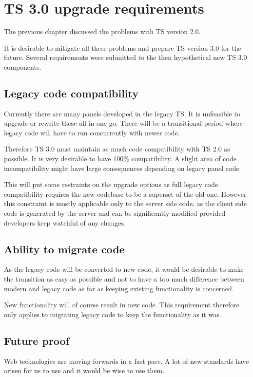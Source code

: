 \chapter{TS 3.0 upgrade requirements}
The previous chapter discussed the problems with TS version 2.0.

It is desirable to mitigate all these problems and prepare TS version 3.0 for
the future.
Several requirements were submitted to the then hypothetical new TS 3.0
components.

\section{Legacy code compatibility}
Currently there are many panels developed in the legacy TS. It is unfeasible to
upgrade or rewrite these all in one go. There will be a transitional period where
legacy code will have to run concurrently with newer code.

Therefore TS 3.0 must maintain as much code compatibility with TS 2.0 as possible.
It is very desirable to have 100\% compatibility. A slight area of code
incompatibility might have large consequences depending on legacy panel code.

This will put some restraints on the upgrade options as full legacy code
compatibility requires the new codebase to be a superset of the old one.
However this constraint is mostly applicable only to the server side code, as
the client side code is generated by the server and can be significantly
modified provided developers keep watchful of any changes.

\section{Ability to migrate code}
As the legacy code will be converted to new code, it would be desirable to
make the transition as easy as possible and not to have a too much difference
between modern and legacy code as far as keeping existing functionality is
concerned.

New functionality will of course result in new code. This requirement therefore
only applies to migrating legacy code to keep the functionality as it was.

\section{Future proof}
Web technologies are moving forwards in a fast pace. A lot of new standards have
arisen for us to use and it would be wise to use them.

